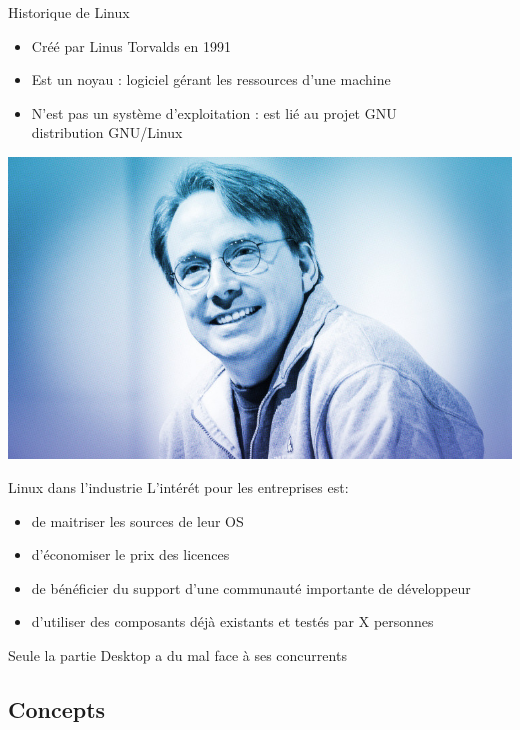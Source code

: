 \begin{frame}{Historique de Linux}{}
  \begin{itemize}
  \item Créé par Linus Torvalds en 1991
  \item Est un noyau : logiciel gérant les ressources d'une machine
  \item N'est pas un système d'exploitation : est lié au projet GNU\\
    \MVRightarrow{} distribution GNU/Linux
  \end{itemize}
    \center \includegraphics[height=0.3\textheight]{pictures/01_cours_magistral/torvalds.jpg}
\end{frame}

\begin{frame}{Linux dans l'industrie}{}
  L'intérét pour les entreprises est:
  \begin{itemize}
  \item de maitriser les sources de leur OS
  \item d'économiser le prix des licences
  \item de bénéficier du support d'une communauté importante de développeur
  \item d'utiliser des composants déjà existants et testés par X personnes
  \end{itemize}
  Seule la partie Desktop a du mal face à ses concurrents
 \end{frame}

\subsection{Concepts}

